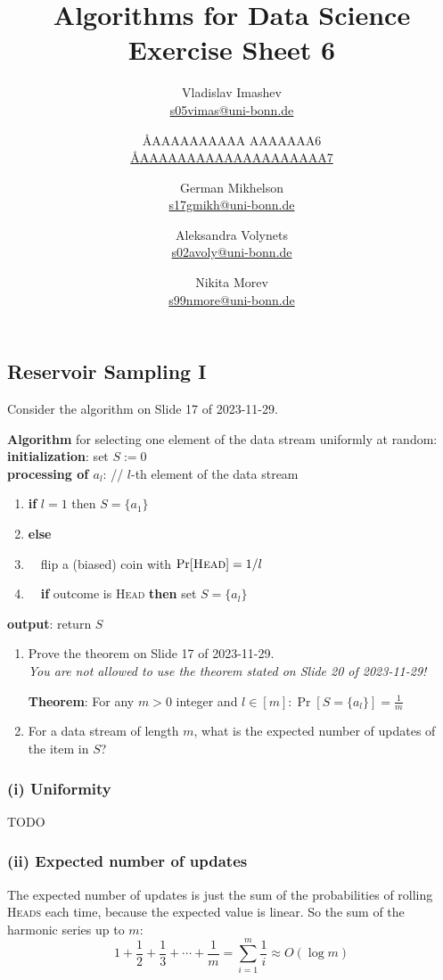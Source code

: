 \documentclass{article}
\title{Algorithms for Data Science \\ Exercise Sheet 6}
\author{
  Vladislav Imashev \\ \href{mailto:s05vimas@uni-bonn.de}{s05vimas@uni-bonn.de} \and
  \AA{AAAAAAAAAA AAAAAAA}{6} \\ \href{mailto:\AA{AAAAAAAAAAAAAAAAAAAA}{7}}{\AA{AAAAAAAAAAAAAAAAAAAA}{7}} \and
  German Mikhelson \\ \href{mailto:s17gmikh@uni-bonn.de}{s17gmikh@uni-bonn.de} \and
  Aleksandra Volynets \\ \href{mailto:s02avoly@uni-bonn.de}{s02avoly@uni-bonn.de} \and
  Nikita Morev \\ \href{mailto:s99nmore@uni-bonn.de}{s99nmore@uni-bonn.de}
}
\begin{document}
  \maketitle

  \setcounter{section}{6}
  \subsection{Reservoir Sampling I}
  \begin{centerframebox}
    Consider the algorithm on Slide 17 of 2023-11-29.

    \textbf{Algorithm} for selecting one element of the data stream uniformly at random: \\
    \textbf{initialization}: set $S := 0$ \\
    \textbf{processing of $a_l$}: // $l$-th element of the data stream
    \begin{enumerate}[topsep=0pt,itemsep=-1ex,partopsep=1ex,parsep=1ex]
      \item \textbf{if} $l = 1$ then $S = \{a_1\}$
      \item \textbf{else}
      \item ~~flip a (biased) coin with $\Pr[\textsc{Head}] = 1/l$
      \item ~~\textbf{if} outcome is \textsc{Head} \textbf{then} set $S = \{a_l\}$
    \end{enumerate}
    \textbf{output}: return $S$

    \begin{enumerate}[label=(\roman*)]
      \item Prove the theorem on Slide 17 of 2023-11-29. \\
      \textit{You are not allowed to use the theorem stated on Slide 20 of 2023-11-29!}

      \textbf{Theorem}: For any $m > 0$ integer and $l \in [m]: \Pr[S = \{a_l\}] = \frac{1}{m}$

      \item For a data stream of length $m$, what is the expected number of updates of the item in $S$?
    \end{enumerate}
  \end{centerframebox}
  \subsubsection*{(i) Uniformity}
  TODO%

  \subsubsection*{(ii) Expected number of updates}
  The expected number of updates is just the sum of the probabilities of rolling \textsc{Heads} each time,
  because the expected value is linear.
  So the sum of the harmonic series up to $m$:
  \[ 1+\frac{1}{2}+\frac{1}{3} + \cdots + \frac{1}{m} = \sum_{i=1}^m \frac{1}{i} \approx O(\log m) \]
\end{document}
